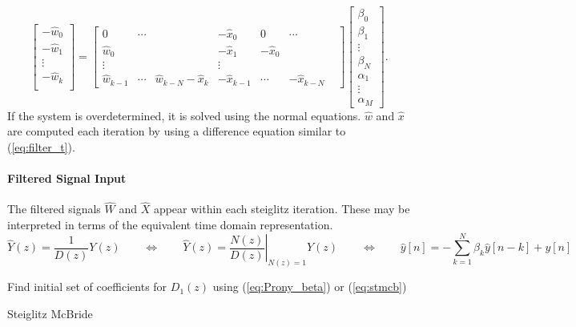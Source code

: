 \documentclass[10pt]{amsart}
\begin{document}
\begin{equation}
	\left[\begin{array}{c}-\hat w_{0} \\-\hat w_{1} \\\vdots \\-\hat w_{k} \\ \end{array}\right] =
	\left[\begin{array}{ccccccc}  0 & \cdots &  & -{\hat x_0} & 0 & \cdots \\
		 \hat w_{0} &   &  &   -\hat x_{1} & -\hat x_{0} &   &   \\
		\vdots   &   & & \vdots  \\
		 \hat w_{k-1} & \cdots & \hat w_{k-N} -\hat x_k & -\hat x_{k-1} & \cdots & -\hat x_{k-N}
	\end{array}\right]
	\left[\begin{array}{c} \beta_0 \\\beta_1 \\\vdots \\\beta_N \\ \alpha_1 \\ \vdots \\ \alpha_M\end{array}\right].
	\label{eq:stmcb}
\end{equation}
 If the system is overdetermined, it is solved using the normal equations.
$\hat w$ and $\hat x$ are computed each iteration by using a difference equation similar to (\ref{eq:filter_t}). \\

\paragraph{\textbf{Filtered Signal Input}} The filtered signals $\hat{W}$
and $\hat{X}$ appear within each steiglitz iteration.
These may be interpreted in terms of the equivalent time domain
representation.
\[
  \hat{Y}(z) = \frac{1}{D(z)} Y(z) 
   \qquad \Leftrightarrow \qquad
  \hat{Y}(z) = \left. \frac{N(z)}{D(z)} \right|_{N(z) = 1 } Y(z) 
   \qquad \Leftrightarrow \qquad
	 \hat{y}[n]   = - \sum\limits_{k=1}^N \beta_k \hat{y}[n-k] +  y[n]
\]



\begin{algorithm}[H]
  Find initial set of coefficients for $D_1(z)$ using (\ref{eq:Prony_beta}) or (\ref{eq:stmcb})\;
 \caption{Steiglitz McBride}
\end{algorithm}
\end{document}
